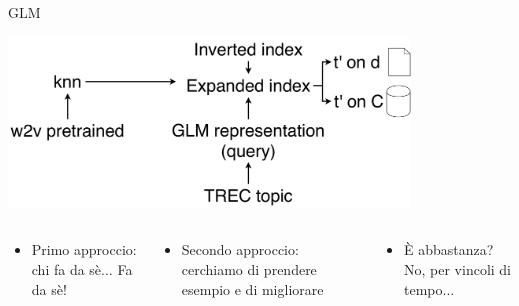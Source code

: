 \begin{frame}{GLM}
    \begin{center}
        \includegraphics[width=0.8\textwidth]{img/reproduction.pdf}
    \end{center}
    \begin{columns}
        \begin{column}{0.33\textwidth}
            \begin{itemize}
                \item Primo approccio: chi fa da sè... Fa da sè!
            \end{itemize}
        \end{column}
        \begin{column}{0.33\textwidth}
            \begin{itemize}
                \item Secondo approccio: cerchiamo di prendere esempio e di migliorare
            \end{itemize}
        \end{column}
        \begin{column}{0.33\textwidth}
            \begin{itemize}
                \item È abbastanza? No, per vincoli di tempo...
            \end{itemize}
        \end{column}
    \end{columns}
\end{frame}
